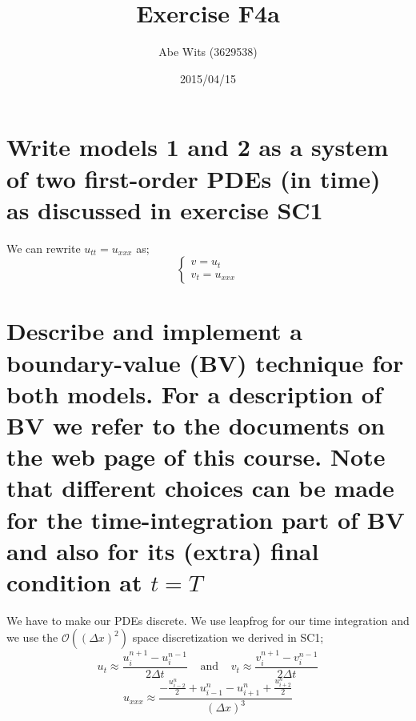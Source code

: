\documentclass{article}
\renewcommand{\(}{\left(}
\renewcommand{\)}{\right)}
\newcommand{\hot}[1]{\mathcal{O}\(#1\)}
\newcommand{\uinp}{u_i^{n+1}}
\newcommand{\uinm}{u_i^{n-1}}
\newcommand{\uipn}{u_{i+1}^n}
\newcommand{\uimn}{u_{i-1}^n}
\newcommand{\vinp}{v_i^{n+1}}
\newcommand{\vinm}{v_i^{n-1}}
\newcommand{\dt}{\Delta t}
\newcommand{\dx}{\Delta x}
\newcommand{\half}[1]{\frac{{#1}}{2}}
\begin{document}
\title{Exercise F4a}
\author{Abe Wits (3629538)}
\date{2015/04/15}%

\maketitle

\setlength{\parskip}{0.2 cm}
\setlength{\parindent}{0.0 cm}

\section*{Write models 1 and 2 as a system of two first-order PDEs (in time) as discussed in exercise \textbf{SC1}}
We can rewrite $u_{tt} = u_{xxx}$ as;
$$
\begin{cases}
v = u_t\\
v_t = u_{xxx}
\end{cases}
$$

\section*{Describe and implement a boundary-value (BV) technique for both models. For a description of BV we refer to the documents on the web page of this course. Note that different choices can be made for the time-integration part of BV and also for its (extra) final condition at $t=T$}
We have to make our PDEs discrete. We use leapfrog for our time integration and we use the $\hot{(\dx)^2}$ space discretization we derived in SC1;
$$u_t \approx \frac{\uinp - \uinm}{2\dt} \;\;\;\;\mathrm{and}\;\;\;\;v_t \approx \frac{\vinp - \vinm}{2\dt}$$
$$u_{xxx} \approx \frac{-\half{u_{i-2}^n}+\uimn-\uipn+\half{u_{i+2}^n}}{(\dx)^3}$$
\end{document}

